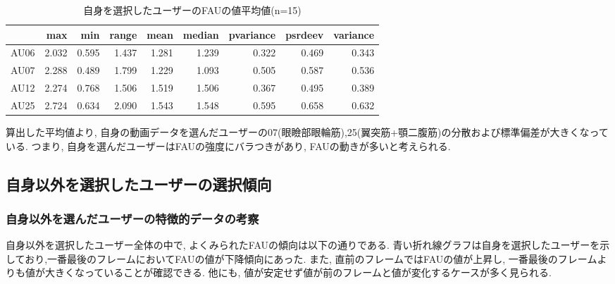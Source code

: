\begin{table}[htb]
  \caption{自身を選択したユーザーのFAUの値平均値(n=15)}
  \label{tb:choicemyself}
  \begin{center}
  \begin{tabular}{|l||r|r|r|r|r|r|r|r|} \hline
    &max	&min	&range	&mean	&median	&pvariance	&psrdeev	&variance \\ \hline \hline
  AU06	&2.032	&0.595	&1.437	&1.281	&1.239	&0.322	&0.469	&0.343 \\ \hline
  AU07	&2.288	&0.489	&1.799	&1.229	&1.093	&0.505	&0.587	&0.536 \\ \hline
  AU12	&2.274	&0.768	&1.506	&1.519	&1.506	&0.367	&0.495	&0.389 \\ \hline
  AU25	&2.724	&0.634	&2.090	&1.543	&1.548	&0.595	&0.658	&0.632 \\ \hline
  \end{tabular}
  \end{center}
\end{table}

算出した平均値より, 自身の動画データを選んだユーザーの07(眼瞼部眼輪筋),25(翼突筋+顎二腹筋)の分散および標準偏差が大きくなっている.
つまり, 自身を選んだユーザーはFAUの強度にバラつきがあり, FAUの動きが多いと考えられる.

\subsection{自身以外を選択したユーザーの選択傾向}

\subsubsection{自身以外を選んだユーザーの特徴的データの考察}
自身以外を選択したユーザー全体の中で, よくみられたFAUの傾向は以下の通りである.
青い折れ線グラフは自身を選択したユーザーを示しており,一番最後のフレームにおいてFAUの値が下降傾向にあった.
また, 直前のフレームではFAUの値が上昇し, 一番最後のフレームよりも値が大きくなっていることが確認できる.
他にも, 値が安定せず値が前のフレームと値が変化するケースが多く見られる.


